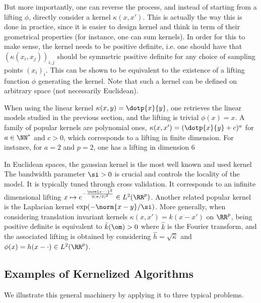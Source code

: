 But more importantly, one can reverse the process, and instead of starting from a lifting $\phi$, directly consider a kernel $\kappa(x,x')$. This is actually the way this is done in practice, since it is easier to design kernel and think in term of their geometrical properties (for instance, one can sum kernels). In order for this to make sense, the kernel needs to be positive definite, i.e. one should have that $(\kappa(x_i,x_j))_{i,j}$ should be symmetric positive definite for any choice of sampling points $(x_i)_i$. This can be shown to be equivalent to the existence of a lifting function $\phi$ generating the kernel.
%
Note that such a kernel can be defined on arbitrary space (not necessarily Euclidean). 


When using the linear kernel $\kappa(x,y)=\dotp{x}{y}$, one retrieves the linear models studied in the previous section, and the lifting is trivial $\phi(x)=x$.
%
A family of popular kernels are polynomial ones,  $\kappa(x,x') = (\dotp{x}{y}+c)^a$ for $a
\in \NN^*$ and $c>0$, which corresponds to a lifting in finite dimension. For instance, for $a=2$ and $p=2$, one has a lifting in dimension $6$

In Euclidean spaces, the gaussian kernel is the most well known and used kernel
The bandwidth parameter $\si>0$ is crucial and controls the locality of
the model. It is typically tuned through cross validation. It corresponds to an infinite dimensional lifting $x \mapsto e^{-\frac{\norm{x-\cdot}^2}{2(\sigma/2)^2}} \in L^2(\RR^p)$.
%
Another related popular kernel is the Laplacian kernel $\exp(-\norm{x-y}/\si)$.
%
More generally, when considering translation invariant kernels $\kappa(x,x') = k(x-x')$ on $\RR^p$, being positive definite is equivalent to $\hat k(\om)>0$ where $\hat k$ is the Fourier transform, and the associated lifting is obtained by considering $\hat h=\sqrt{\hat \kappa}$ and $\phi(x)=h(x-\cdot) \in L^2(\RR^p)$. 

\subsection{Examples of Kernelized Algorithms}

We illustrate this general machinery by applying it to three typical problems. 

